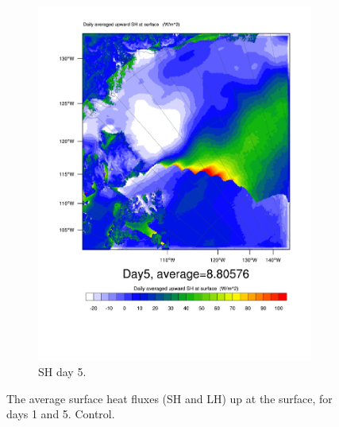 \begin{figure}
\begin{subfigure}{0.48\textwidth}
		\includegraphics[width=\textwidth]{results/control/HFX_Day5.pdf}
		\caption{SH day 5.}
		\label{subfig:sh_r1Day5}
	\end{subfigure}
	\caption{The average surface heat fluxes (SH and LH) up at the surface, for days 1 and 5. Control.}
	\label{fig:surface_fluxes_r1}
\end{figure}

